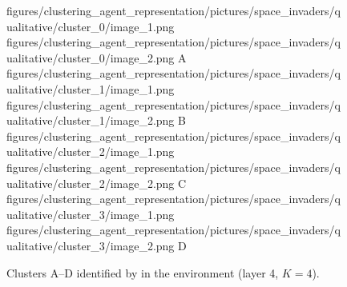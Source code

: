 \begin{figure}[H]
    \qualitativeClusterFigureSetup
    \qualitativeClusterTwo
        {figures/clustering_agent_representation/pictures/space_invaders/qualitative/cluster_0/image_1.png}
        {figures/clustering_agent_representation/pictures/space_invaders/qualitative/cluster_0/image_2.png}
        {A}
    \qualitativeClusterTwo
        {figures/clustering_agent_representation/pictures/space_invaders/qualitative/cluster_1/image_1.png}
        {figures/clustering_agent_representation/pictures/space_invaders/qualitative/cluster_1/image_2.png}
        {B}
    \qualitativeClusterTwo
        {figures/clustering_agent_representation/pictures/space_invaders/qualitative/cluster_2/image_1.png}
        {figures/clustering_agent_representation/pictures/space_invaders/qualitative/cluster_2/image_2.png}
        {C}
    \qualitativeClusterTwo
        {figures/clustering_agent_representation/pictures/space_invaders/qualitative/cluster_3/image_1.png}
        {figures/clustering_agent_representation/pictures/space_invaders/qualitative/cluster_3/image_2.png}
        {D}
    \caption{Clusters A--D identified by  in the \SpaceInvadersName environment (layer 4, $K=4$).}
    \label{fig:qualitative_space_invaders}
\end{figure}
